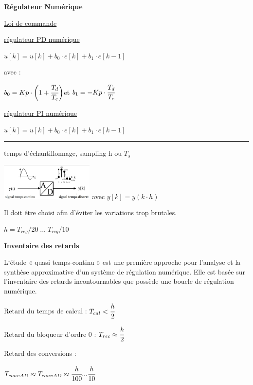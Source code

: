 \documentclass[	DIV=calc,%
							paper=a4,%
							fontsize=11pt,%
							twocolumn]{scrartcl} %
\newcommand{\hformbar}[1]{\bigskip\hrule\vspace{5pt}} %
\newcounter{mycounter}
\newcommand{\formdesc}[1]{\noindent\textbf{#1} \addtocounter{mycounter}{1} \hfill \themycounter}
\newcommand{\formtitle}[1]{\noindent\underline{#1}}
\begin{document}
\formdesc{Régulateur Numérique}

\formtitle{Loi de commande }

\underline{régulateur PD numérique}
\vspace{3mm}

$u[k] = u[k] + b_0 \cdot e[k]+ b_1 \cdot e[k-1]$ 

avec :


\hfill $b_0 = Kp\cdot\bigg(1+\cfrac{T_d}{T_e}\bigg)$\hfill et \hfill $b_1 = -Kp \cdot \cfrac{T_d}{T_e}$ \hfill

\vspace{3mm}

\underline{régulateur PI numérique}
\vspace{3mm}

$u[k] = u[k] + b_0 \cdot e[k]+ b_1 \cdot e[k-1]$ 

\hformbar


\formdesc{Échantillonnage}

temps d'échantillonnage, sampling h ou $T_s$ 
\begin{center}
    \includegraphics[width = 0.35\textwidth]{img/echantillonage.JPG}
    avec $y[k] = y(k \cdot h)$
\end{center}

Il doit être choisi afin d'éviter les variations trop brutales.

$ h = T_{reg}/20 \; ... \; T_{reg}/10$



\formdesc{Inventaire des retards}

L‘étude « quasi temps-continu » est une première approche pour 
l’analyse et la synthèse approximative d’un système de régulation 
numérique.
Elle est basée sur l’inventaire des retards incontournables que 
possède une boucle de régulation numérique.

Retard du temps de calcul : $T_{cal} < \cfrac{h}{2}$

Retard du bloqueur d'ordre 0 : $T_{rec} \approx \cfrac{h}{2}$

\vspace{3mm}

Retard des conversions :

$T_{convAD} \approx T_{convAD} \approx \cfrac{h}{100} ... \cfrac{h}{10} $
\end{document}
